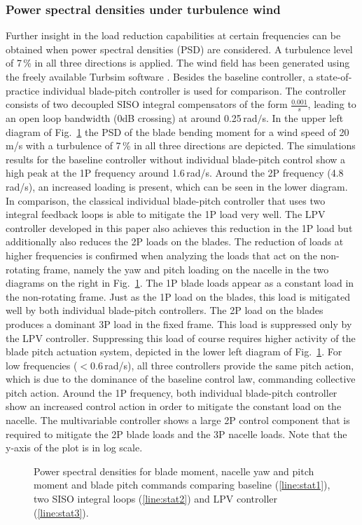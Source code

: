 \documentclass[times]{weauth}
\begin{document}
\subsubsection*{Power spectral densities under turbulence wind}
Further insight in the load reduction capabilities at certain frequencies can be obtained
when power spectral densities (PSD) are considered.
A turbulence level of 7\,\% in all three directions is applied. The wind field
has been generated using the freely available Turbsim software \cite{TurbSim12}.
Besides the baseline controller, a state-of-practice individual blade-pitch controller is used for comparison.
The controller consists of two decoupled SISO integral compensators of the form $\frac{0.001}{s}$, leading to an open loop bandwidth (0dB crossing) at around 0.25$\,$rad$/$s.
In the upper left diagram of Fig.~\ref{fig:frequ} the PSD of the blade bending moment for a wind
speed of 20\,m/s with a turbulence of 7\,\% in all three directions are depicted. The simulations results for the baseline
controller without individual blade-pitch control show a high peak at the 1P
frequency around 1.6\,rad/s. Around the 2P frequency (4.8\,rad/s), an increased loading is present,
which can be seen in the lower diagram. In comparison, the classical individual blade-pitch
controller that uses two integral feedback loops is able to mitigate the 1P
load very well. The LPV controller developed in this paper also
achieves this reduction in the 1P load but additionally also reduces the 2P
loads on the blades.
The reduction of loads at higher frequencies is confirmed when analyzing the
loads that act on the non-rotating frame, namely the yaw and pitch loading on
the nacelle in the two diagrams on the right in Fig.~\ref{fig:frequ}.
The 1P blade loads appear as a constant load in the non-rotating frame.
Just as the 1P load on the blades, this load
is mitigated well by both individual blade-pitch controllers. The 2P load on the blades produces a
dominant 3P load in the fixed frame. This load is suppressed only by the
LPV controller.
Suppressing this load of course requires higher activity of the blade
pitch actuation system, depicted in the lower left diagram of Fig.~\ref{fig:frequ}. For low
frequencies ($<$0.6\,rad/s), all three controllers provide the same pitch
action, which is due to the dominance of the baseline control law, commanding
collective pitch action. Around the 1P frequency,  both individual blade-pitch
controller show an increased control action %
in order to mitigate the constant load on the nacelle. The multivariable
controller shows a large 2P control component that is required to mitigate
the 2P blade loads and the 3P nacelle loads. Note that the y-axis of the plot is in log scale.
\begin{figure}[hbt]
	\centering
	
	\caption{Power spectral densities for blade moment, nacelle yaw and pitch moment and blade pitch commands comparing baseline (\ref{line:stat1}), two SISO integral loops (\ref{line:stat2}) and LPV controller (\ref{line:stat3}).}
	\label{fig:frequ}	
\end{figure}
\end{document}

